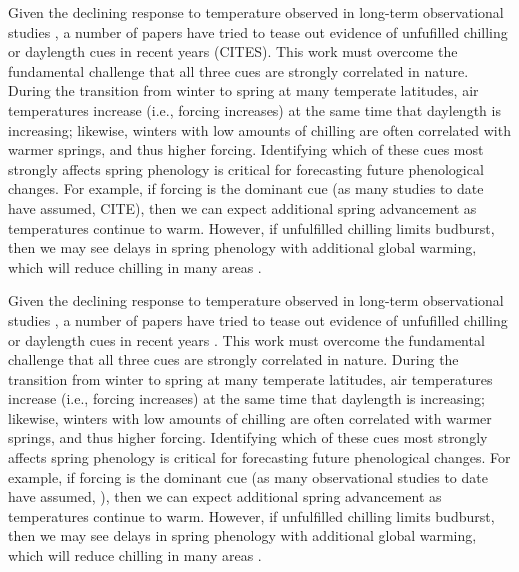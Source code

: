 \documentclass[11pt,letter]{article}
\begin{document}
\par Given the declining response to temperature observed in long-term observational studies \citep{fu2015}, a number of papers have tried to tease out evidence of unfufilled chilling or daylength cues in recent years (CITES). This work must overcome the fundamental challenge that all three cues are strongly correlated in nature. During the transition from winter to spring at many temperate latitudes, air temperatures increase (i.e., forcing increases) at the same time that daylength is increasing; likewise, winters with low amounts of chilling are often correlated with warmer springs, and thus higher forcing.  Identifying which of these cues most strongly affects spring phenology is critical for forecasting future phenological changes. For example, if forcing is the dominant cue (as many studies to date have assumed, CITE), then we can expect additional spring advancement as temperatures continue to warm. However, if unfulfilled chilling limits budburst, then we may see delays in spring phenology with additional global warming, which will reduce chilling in many areas \citep{fraga2019}. 


\par Given the declining response to temperature observed in long-term observational studies \citep{fu2015}, a number of papers have tried to tease out evidence of unfufilled chilling or daylength cues in recent years \citep{Basler:2014aa,zohner2016, Laube:2014a}. This work must overcome the fundamental challenge that all three cues are strongly correlated in nature. During the transition from winter to spring at many temperate latitudes, air temperatures increase (i.e., forcing increases) at the same time that daylength is increasing; likewise, winters with low amounts of chilling are often correlated with warmer springs, and thus higher forcing.  Identifying which of these cues most strongly affects spring phenology is critical for forecasting future phenological changes. For example, if forcing is the dominant cue (as many observational studies to date have assumed, \citep{bradley1999,menzel2006,harrington2015}), then we can expect additional spring advancement as temperatures continue to warm. However, if unfulfilled chilling limits budburst, then we may see delays in spring phenology with additional global warming, which will reduce chilling in many areas \citep{fraga2019}. 
\end{document}
